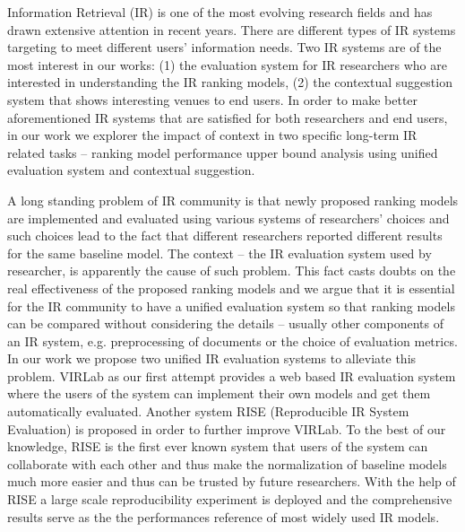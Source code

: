 %
%
Information Retrieval (IR) is one of the most evolving research fields 
and has drawn extensive attention in recent years. 
There are different types of IR systems targeting to meet 
different users' information needs. Two IR systems are of the most interest 
in our works: (1) the evaluation system for IR researchers who are 
interested in understanding the IR ranking models, 
(2) the contextual suggestion system that shows interesting venues to 
end users.
In order to make better aforementioned IR systems that are satisfied 
for both researchers and end users, in our work we explorer the impact of 
context in two specific long-term IR related tasks -- ranking model 
performance upper bound analysis using unified evaluation system 
and contextual suggestion.

A long standing problem of IR community is that newly proposed ranking models 
are implemented and evaluated using various systems of researchers' choices 
and such choices lead to the fact that different researchers reported 
different results for the same baseline model. 
The context -- the IR evaluation system used by researcher, 
is apparently the cause of such problem. This fact casts doubts on the real 
effectiveness of the proposed ranking models and we argue that it is 
essential for the IR community to have a unified evaluation system so that 
ranking models can be compared without considering the details -- usually 
other components of an IR system, e.g. preprocessing of documents 
or the choice of evaluation metrics. 
In our work we propose two unified IR evaluation systems to alleviate this problem. 
VIRLab as our first attempt provides a web based IR evaluation system 
where the users of the system can implement their own models and get them 
automatically evaluated.
Another system RISE (Reproducible IR System Evaluation) is proposed in order 
to further improve VIRLab.
To the best of our knowledge, RISE is the first ever known system that users 
of the system can collaborate with each other and thus make the 
normalization of baseline models much more easier and thus can be trusted 
by future researchers. 
With the help of RISE a large scale reproducibility experiment is deployed 
and the comprehensive results serve as the the performances reference of 
most widely used IR models.

